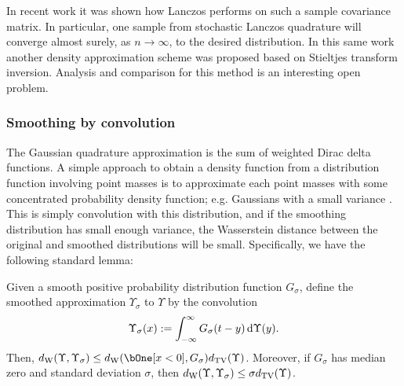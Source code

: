 \begin{remark}
In recent work \cite{ding_trogdon_21} it was shown how Lanczos performs on such a sample covariance matrix. 
In particular, one sample from stochastic Lanczos quadrature will converge almost surely, as \( n\to\infty \), to the desired distribution.
In this same work another density approximation scheme was proposed based on Stieltjes transform inversion. 
Analysis and comparison for this method is an interesting open problem.
\end{remark}


\subsubsection{Smoothing by convolution}
\label{sec:smoothing}


The Gaussian quadrature approximation is the sum of weighted Dirac delta functions.
A simple approach to obtain a density function from a distribution function involving point masses is to approximate each point masses with some concentrated probability density function; e.g. Gaussians with a small variance \cite{lin_saad_yang_16,ghorbani_krishnan_xiao_19}.
This is simply convolution with this distribution, and if the smoothing distribution has small enough variance, the Wasserstein distance between the original and smoothed distributions will be small. 
Specifically, we have the following standard lemma:
\begin{lemma}
    \label{thm:smoothing_wass}
    Given a smooth positive probability distribution function \( G_\sigma \), define the smoothed approximation \( \Upsilon_\sigma \) to \( \Upsilon \) by the convolution
    \begin{equation*}
        \Upsilon_\sigma(x)  := \int_{-\infty}^{\infty} G_\sigma(t-y) \,\textup{d}\Upsilon(y).
    \end{equation*}
    Then, \( \W(\Upsilon,\Upsilon_\sigma) \leq \W(\bOne[ x < 0], G_\sigma) \TV(\Upsilon) \).
    Moreover, if \( G_\sigma \) has median zero and standard deviation \( \sigma \), then \( d_{\mathrm{W}}(\Upsilon,\Upsilon_\sigma)  \leq \sigma d_{\mathrm{TV}}(\Upsilon) \). 
\end{lemma}

